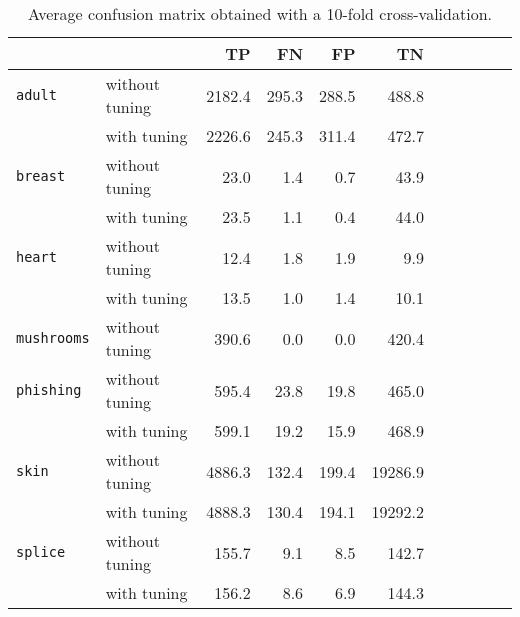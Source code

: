 
\begin{table}[h!]
\begin{center}
  \caption{Average confusion matrix obtained with a 10-fold cross-validation.}

  \begin{small}
  \begin{tabular}{|l|l|r|r|r|r|r|r|r|r|r|}
    \hline
     & & TP & FN & FP & TN \\
    \hline
    \multirow{}{}{\texttt{adult}} & without tuning  & 2182.4 & 295.3 & 288.5 & 488.8 \\
      & with tuning & 2226.6 & 245.3 & 311.4 & 472.7 \\\hline
    \multirow{}{}{\texttt{breast}} & without tuning & 23.0 & 1.4 & 0.7 & 43.9 \\
      & with tuning & 23.5 & 1.1 & 0.4 & 44.0 \\\hline
    \multirow{}{}{\texttt{heart}} &without tuning & 12.4 & 1.8 & 1.9 & 9.9 \\
      & with tuning & 13.5& 1.0 & 1.4 & 10.1 \\\hline
    \texttt{mushrooms} & without tuning & 390.6 & 0.0 & 0.0 & 420.4 \\\hline
    \multirow{}{}{\texttt{phishing}} & without tuning & 595.4 & 23.8 & 19.8 & 465.0\\
      & with tuning & 599.1 & 19.2 & 15.9 & 468.9 \\\hline
    \multirow{}{}{\texttt{skin}} & without tuning & 4886.3 & 132.4 & 199.4 & 19286.9 \\
      & with tuning & 4888.3 & 130.4 & 194.1 & 19292.2 \\\hline
    \multirow{}{}{\texttt{splice}} &without tuning & 155.7 & 9.1 & 8.5 & 142.7 \\
      & with tuning & 156.2 & 8.6 & 6.9 & 144.3 \\
    \hline
  \end{tabular}
  \end{small}

  \label{table:confusion_matrix}
\end{center}
\end{table}